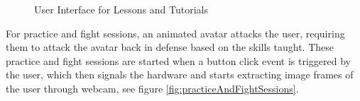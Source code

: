 \begin{figure}
    \centering
    \quad 
    \caption{User Interface for Lessons and Tutorials} 
    \label{fig:tutorials}
\end{figure}

For practice and fight sessions, an animated avatar attacks the user, requiring them to attack the avatar back in defense based on the skills taught. These practice and fight sessions are started when a button click event is triggered by the user, which then signals the hardware and starts extracting image frames of the user through webcam, see figure \ref{fig:practiceAndFightSessions}.

